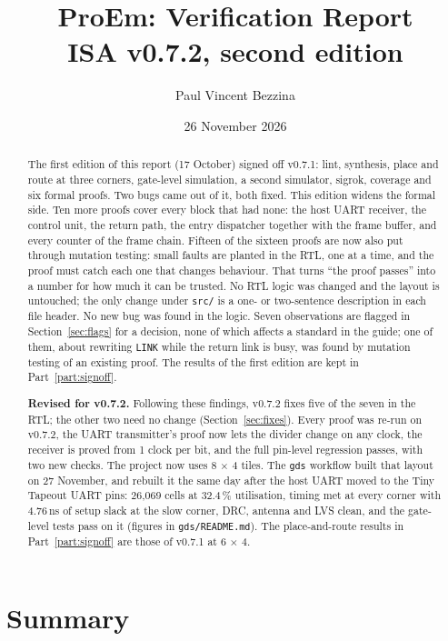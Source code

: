 \documentclass[11pt,a4paper]{article}
\title{ProEm: Verification Report\\\large ISA v0.7.2, second edition}
\author{Paul Vincent Bezzina}
\date{26 November 2026}
\newcommand{\sig}[1]{\texttt{#1}}
\begin{document}
\maketitle
\thispagestyle{fancy}

\begin{abstract}
The first edition of this report (17 October) signed off v0.7.1: lint, synthesis, place and route at three corners, gate-level simulation, a second simulator, sigrok, coverage and six formal proofs. Two bugs came out of it, both fixed. This edition widens the formal side. Ten more proofs cover every block that had none: the host UART receiver, the control unit, the return path, the entry dispatcher together with the frame buffer, and every counter of the frame chain. Fifteen of the sixteen proofs are now also put through mutation testing: small faults are planted in the RTL, one at a time, and the proof must catch each one that changes behaviour. That turns ``the proof passes'' into a number for how much it can be trusted. No RTL logic was changed and the layout is untouched; the only change under \sig{src/} is a one- or two-sentence description in each file header. No new bug was found in the logic. Seven observations are flagged in Section~\ref{sec:flags} for a decision, none of which affects a standard in the guide; one of them, about rewriting \sig{LINK} while the return link is busy, was found by mutation testing of an existing proof. The results of the first edition are kept in Part~\ref{part:signoff}.

\textbf{Revised for v0.7.2.} Following these findings, v0.7.2 fixes five of the seven in the RTL; the other two need no change (Section~\ref{sec:fixes}). Every proof was re-run on v0.7.2, the UART transmitter's proof now lets the divider change on any clock, the receiver is proved from 1 clock per bit, and the full pin-level regression passes, with two new checks. The project now uses 8 $\times$ 4 tiles. The \sig{gds} workflow built that layout on 27 November, and rebuilt it the same day after the host UART moved to the Tiny Tapeout UART pins: 26,069 cells at 32.4\,\% utilisation, timing met at every corner with 4.76\,ns of setup slack at the slow corner, DRC, antenna and LVS clean, and the gate-level tests pass on it (figures in \sig{gds/README.md}). The place-and-route results in Part~\ref{part:signoff} are those of v0.7.1 at 6 $\times$ 4.
\end{abstract}

\section{Summary}
\end{document}
